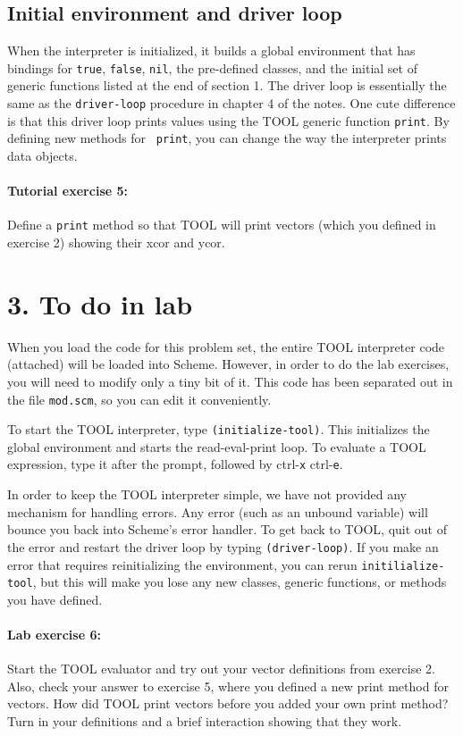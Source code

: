 \subsection{Initial environment and driver loop}

When the interpreter is initialized, it builds a global environment
that has bindings for {\tt true}, {\tt false}, {\tt nil}, the
pre-defined classes, and the initial set of generic functions listed
at the end of section 1.  The driver loop is essentially the same as
the {\tt driver-loop} procedure in chapter 4 of the notes.  One cute
difference is that this driver loop prints values using the TOOL
generic function {\tt print}.  By defining new methods for {\tt
print}, you can change the way the interpreter prints data objects.

\paragraph{Tutorial exercise 5:} Define a {\tt print} method so that
TOOL will print vectors (which you defined in exercise 2) showing
their xcor and ycor.

\section{3. To do in lab}

When you load the code for this problem set, the entire TOOL
interpreter code (attached) will be loaded into Scheme.  However, in
order to do the lab exercises, you will need to modify only a tiny bit
of it.  This code has been separated out in the file {\tt mod.scm},
so you can edit it conveniently.

To start the TOOL interpreter, type {\tt (initialize-tool)}.  This
initializes the global environment and starts the read-eval-print
loop.  To evaluate a TOOL expression, type it after the prompt,
followed by {\sc ctrl-}{\tt x} {\sc ctrl-}{\tt e}.

In order to keep the TOOL interpreter simple, we have not provided any
mechanism for handling errors.  Any error (such as an unbound
variable) will bounce you back into Scheme's error handler.  To get
back to TOOL, quit out of the error and restart the driver loop by
typing {\tt (driver-loop)}.  If you make an error that requires
reinitializing the environment, you can rerun {\tt initilialize-tool},
but this will make you lose any new classes, generic functions, or
methods you have defined.

\paragraph{Lab exercise 6:}  Start the TOOL evaluator and try out
your vector definitions from exercise 2.  Also, check your answer to
exercise 5, where you defined a new print method for vectors.  How did
TOOL print vectors before you added your own print method?  Turn in
your definitions and a brief interaction showing that they work.

